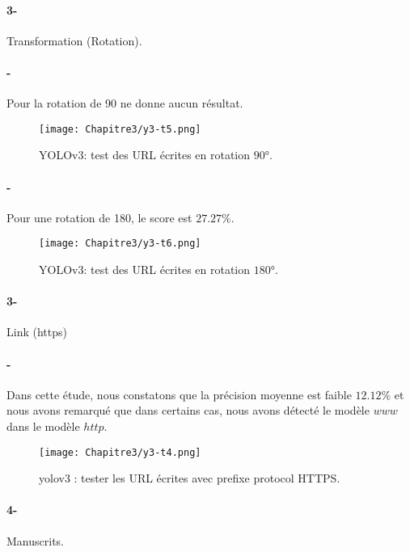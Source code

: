            \paragraph{3-} Transformation (Rotation).
           \paragraph{-} Pour la rotation de 90 ne donne aucun résultat.
           \begin{figure}[H]
               \centering
                \texttt{[image: Chapitre3/y3-t5.png]}
                \caption{YOLOv3: test des URL écrites en rotation $90°$.}
                \label{y3_t5}
                \end{figure}
           
           \paragraph{-} Pour une rotation de 180, le score est $27.27\%$.
           \begin{figure}[H]
               \centering
                \texttt{[image: Chapitre3/y3-t6.png]}
                \caption{YOLOv3: test des URL écrites en rotation $180°$.}
                \label{y3_t6}
                \end{figure}

           \paragraph{3-}Link (https)
           \paragraph{-} Dans cette étude, nous constatons que  la précision moyenne  est faible $12.12\%$ et nous avons remarqué que dans certains cas, nous avons détecté le modèle $www$ dans le modèle $http$.
           
           \begin{figure}[H]
               \centering
                \texttt{[image: Chapitre3/y3-t4.png]}
                \caption{yolov3 : tester les URL écrites avec prefixe protocol HTTPS.}
                \label{y3_t4}
                \end{figure}


           \paragraph{4-} Manuscrits.
